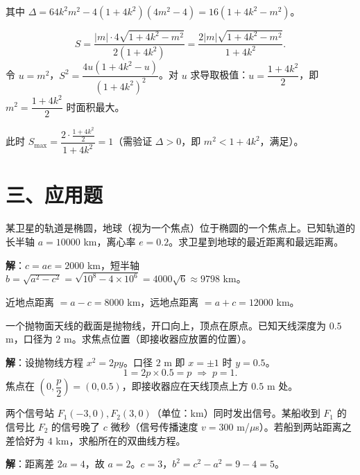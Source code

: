 \documentclass[12pt, a4paper]{ctexart}
\begin{document}
其中 $\Delta=64k^2m^2-4(1+4k^2)(4m^2-4)=16(1+4k^2-m^2)$。

\[
  S=\frac{|m|\cdot4\sqrt{1+4k^2-m^2}}{2(1+4k^2)}=\frac{2|m|\sqrt{1+4k^2-m^2}}{1+4k^2}.
\]
令 $u=m^2$，$S^2=\dfrac{4u(1+4k^2-u)}{(1+4k^2)^2}$。对 $u$ 求导取极值：$u=\dfrac{1+4k^2}{2}$，即 $m^2=\dfrac{1+4k^2}{2}$ 时面积最大。

此时 $S_{\max}=\dfrac{2\cdot\frac{1+4k^2}{2}}{1+4k^2}=1$（需验证 $\Delta>0$，即 $m^2<1+4k^2$，满足）。

\section*{\textcolor{apppurple}{三、应用题}}

\begin{appbox}[【应用1】卫星轨道]
某卫星的轨道是椭圆，地球（视为一个焦点）位于椭圆的一个焦点上。已知轨道的长半轴 $a=10000$ km，离心率 $e=0.2$。求卫星到地球的最近距离和最远距离。
\end{appbox}

\noindent\textbf{解}：$c=ae=2000$ km，短半轴 $b=\sqrt{a^2-c^2}=\sqrt{10^8-4\times10^6}=4000\sqrt{6}\approx9798$ km。

近地点距离 $=a-c=8000$ km，远地点距离 $=a+c=12000$ km。

\vspace{6pt}

\begin{appbox}[【应用2】抛物面天线]
一个抛物面天线的截面是抛物线，开口向上，顶点在原点。已知天线深度为 $0.5$ m，口径为 $2$ m。求焦点位置（即接收器应放置的位置）。
\end{appbox}

\noindent\textbf{解}：设抛物线方程 $x^2=2py$。口径 $2$ m 即 $x=\pm1$ 时 $y=0.5$。
\[
  1=2p\times0.5=p\;\Longrightarrow\;p=1.
\]
焦点在 $\left(0,\dfrac{p}{2}\right)=(0,0.5)$，即接收器应在天线顶点上方 $0.5$ m 处。

\vspace{6pt}

\begin{appbox}[【应用3】导航定位]
两个信号站 $F_1(-3,0),F_2(3,0)$（单位：km）同时发出信号。某船收到 $F_1$ 的信号比 $F_2$ 的信号晚了 $c$ 微秒（信号传播速度 $v=300$ m/$\mu$s）。若船到两站距离之差恰好为 $4$ km，求船所在的双曲线方程。
\end{appbox}

\noindent\textbf{解}：距离差 $2a=4$，故 $a=2$。$c=3$，$b^2=c^2-a^2=9-4=5$。
\end{document}
